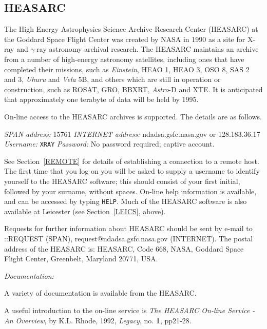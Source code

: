 \documentclass[twoside,11pt,nolof]{starlink}
\begin{document}
\subsection{HEASARC
\label{HEASARC}}

The High Energy Astrophysics Science Archive Research Center (HEASARC)
at the Goddard Space Flight Center was created by NASA in 1990 as a site
for X-ray and $\gamma$-ray astronomy archival research. The HEASARC
maintains an archive from a number of high-energy astronomy satellites,
including ones that have completed their missions, such as \textit{Einstein}, HEAO 1, HEAO 3, OSO 8, SAS 2 and 3, \textit{Uhuru} and \textit{Vela} 5B, and others which are still in operation or construction, such
as ROSAT, GRO, BBXRT, \textit{Astro}-D and XTE. It is anticipated that
approximately one terabyte of data will be held by 1995.

On-line access to the HEASARC archives is supported. The details are as
follows.

\textit{SPAN address: } 15761
\newline \textit{INTERNET address:} ndadsa.gsfc.nasa.gov or 128.183.36.17
\newline \textit{Username:} \verb-XRAY-
\newline \textit{Password:} No password required; captive account.

See Section~\ref{REMOTE} for details of establishing a connection to
a remote host. The first time that you log on you will be asked to
supply a username to identify yourself to the HEASARC software; this
should consist of your first initial, followed by your surname, without
spaces. On-line help information is available, and can be accessed by
typing \verb-HELP-. Much of the HEASARC software is also available at
Leicester (see Section~\ref{LEICS}, above).

Requests for further information about HEASARC should be sent by e-mail
to
::REQUEST (SPAN), request@ndadsa.gsfc.nasa.gov (INTERNET).
The postal address of the HEASARC is: HEASARC, Code 668, NASA, Goddard
Space Flight Center, Greenbelt, Maryland 20771, USA.

\textit{Documentation:}

A variety of documentation is available from the HEASARC.

A useful introduction to the on-line service is \textit{The HEASARC On-line
Service - An Overview}, by K.L. Rhode, 1992, \textit{Legacy}, no. \textbf{1},
pp21-28.
\end{document}
